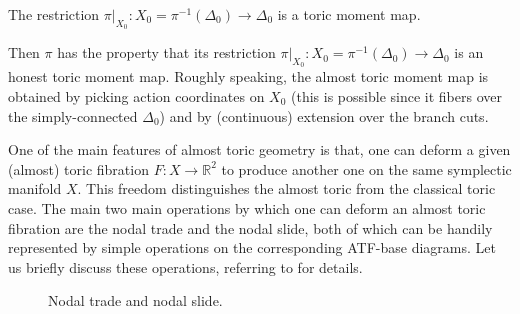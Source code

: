 \documentclass[12pt,a4paper,draft]{scrartcl}
\begin{document}
\begin{proposition}
    \label{thm:toricmomentmap}
    The restriction $\pi\vert_{X_0} \colon X_0 = \pi^{-1}(\Delta_0) \rightarrow \Delta_0$ is a toric moment map.
\end{proposition}

Then $\pi$ has the property that its restriction $\pi\vert_{X_0} \colon X_0 = \pi^{-1}(\Delta_0) \rightarrow \Delta_0$ is an honest toric moment map.
Roughly speaking, the almost toric moment map is obtained by picking action coordinates on $X_0$ (this is possible since it fibers over the simply-connected $\Delta_0$) and by (continuous) extension over the branch cuts.

One of the main features of almost toric geometry is that, one can deform a given (almost) toric fibration $F \colon X \rightarrow \mathbb{R}^2$ to produce another one on the same symplectic manifold $X$.
This freedom distinguishes the almost toric from the classical toric case.
The main two main operations by which one can deform an almost toric fibration are the nodal trade and the nodal slide, both of which can be handily represented by simple operations on the corresponding ATF-base diagrams.
Let us briefly discuss these operations, referring to \cite[Sections 8.2-8.3]{evans2021atfs} for details.

\begin{figure}
  \centering
  \caption{Nodal trade and nodal slide.}
  \label{fig:nodal_trade_and_slide}
\end{figure}
\end{document}
